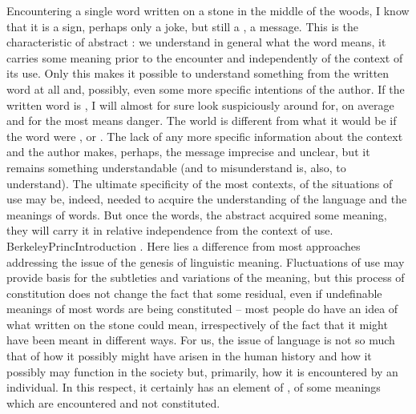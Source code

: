 Encountering a single word written on a stone in the middle of the woods, I know
that it is a sign, perhaps only a joke, but still a , a message. This
is the characteristic of abstract : we understand in
general what the word means, it carries some meaning prior to the 
encounter and independently of the context of its use.  Only this  makes it possible to understand something from the written word at
all and, possibly, even some more specific intentions of the author.  If the written word is , I
will almost for sure look suspiciously around for, on average and for the most
 means danger. The world is different from what
it would be if the word were , or . The lack of any more
specific information about the context and the author makes, perhaps, the
message imprecise and unclear, but it remains something understandable (and to
misunderstand is, also, to understand).  The ultimate specificity of the most
 contexts, of the  situations of use may be, indeed,
needed to acquire the understanding of the language and the meanings of words.
But once the words, the abstract  acquired some meaning, they will
carry it in relative independence from the context of use. \citet{May we not,
  for example, be affected with the promise of a good thing, though we have not
  an idea of what it is? Or is not the being threatened with danger sufficient
  to excite a dread, though we think not of any particular evil likely to befall
  us, nor yet frame to ourselves an idea of danger in
  abstract?}{BerkeleyPrinc}{Introduction . Here lies a difference from
  most approaches addressing the issue of the genesis of linguistic meaning.
  Fluctuations of use may provide basis for the subtleties and variations of the
  meaning, but this process of constitution does not change the fact that some
  residual, even if undefinable meanings of most words are being constituted --
  most people do have an idea of what  written on the stone could
  mean, irrespectively of the fact that it might have been meant in different
  ways.  For us, the issue of language is not so much that of how it possibly
  might have arisen in the human history and how it possibly may function in the
  society but, primarily, how it is encountered by an individual. In this
  respect, it certainly has an element of , of some meanings
  which are encountered and not constituted.}

